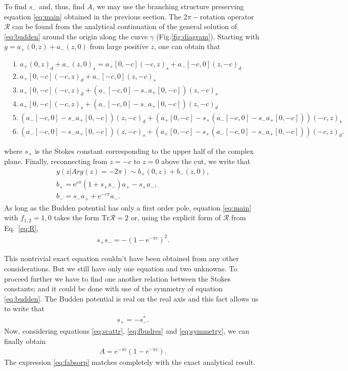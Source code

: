 \documentclass[aip,jmp,reprint]{revtex4-1}
\def\rme{\mathrm{e}}
\def\R{\bm{\mathcal{R}}}
\def\Tr{\mathrm{Tr}}
\begin{document}
To find $s_-$ and, thus, find $A$, we may use the branching structure preserving 
equation \eqref{eq:main} obtained in the previous section. The $2\pi-$rotation operator $\R$
can be found from the analytical continuation of the general solution of \eqref{eq:budden}
around the origin along the curve $\gamma$ (Fig.\ref{fig:diagram}). 
Starting with $y=a_+(0,z) + a_-(z,0)$ from large positive $z$, 
one can obtain that
\begin{widetext}
\begin{equation}
\begin{split}
&1.\ a_+(0,z)_d+a_-(z,0)_s=a_+[0,-c](-c,z)_s + a_-[-c,0](z,-c)_d
\\
&2.\ a_+[0,-c](-c,z)_d + a_-[-c,0](z,-c)_s 
\\
&3.\ a_+[0,-c](-c,z)_d + (a_-[-c,0] - s_- a_+[0,-c])(z,-c)_s 
\\
&4.\ a_+[0,-c](-c,z)_s + (a_-[-c,0] - s_- a_+[0,-c])(z,-c)_d 
\\
&5.\ (a_-[-c,0] - s_- a_+[0,-c])(z,-c)_d + (a_+[0,-c] - s_+ (a_-[-c,0] - s_- a_+[0,-c]))(-c,z)_s
\\
&6.\ (a_-[-c,0] - s_- a_+[0,-c])(z,-c)_s + (a_+[0,-c] - s_+ (a_-[-c,0] - s_- a_+[0,-c]))(-c,z)_d.
\end{split}
\end{equation}
\end{widetext}
where $s_+$ is the Stokes constant corresponding to the upper half of the complex plane.
Finally, reconnecting from $z=-c$ to $z=0$ above the cut, we write that
\begin{equation}
\begin{split}
y(z | Arg(z) = -2\pi) \sim b_+(0,z) + b_-(z,0),
\\
b_+ = \rme^{c \pi} (1 + s_+s_-)a_+ - s_+a_-,
\\
b_- = s_- a_+ + \rme^{-c \pi} a_-.
\label{eq:R} 
\end{split}
\end{equation}
As long as the Budden potential has only a first order pole, equation \eqref{eq:main}
with $f_{1,2}=1,0$ takes the form $\Tr\R=2$ or, using the explicit form of $\R$ from Eq.~\eqref{eq:R},
\begin{eqnarray}
s_+s_- = - (1-\rme^{- \pi c})^2.
\label{eq:fbudres}
\end{eqnarray}

This nontrivial exact equation couldn't have been obtained from any other considerations. But we
still have only one equation and two unknowns. To proceed further we have to find one another
relation between the Stokes constants; and it could be done with use of the symmetry 
of equation \eqref{eq:budden}. The Budden potential is real on the real axis and
this fact allows us to write\cite{aksymm,frsymm} that
\begin{eqnarray}
s_+ = -s_-^*.
\label{eq:symmetry}
\end{eqnarray}
Now, considering equations \eqref{eq:scattr}, \eqref{eq:fbudres} and \eqref{eq:symmetry}, we can
finally obtain 
\begin{eqnarray}
A = e^{-\pi c}(1-e^{-\pi c}).
\label{eq:fabsorp}
\end{eqnarray}
The expression \eqref{eq:fabsorp} matches completely with the exact analytical result\cite{rwbook}.
\end{document}
